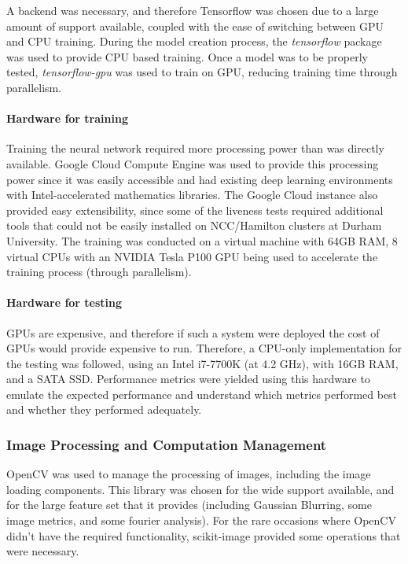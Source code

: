 \documentclass[10pt,a4paper]{article}
\begin{document}
            A backend was necessary, and therefore Tensorflow was chosen due to a large amount of support available, coupled with the ease of switching between GPU and CPU training. During the model creation process, the \emph{tensorflow} package was used to provide CPU based training. Once a model was to be properly tested, \emph{tensorflow-gpu} was used to train on GPU, reducing training time through parallelism.  

            \paragraph{Hardware for training}
            Training the neural network required more processing power than was directly available. Google Cloud Compute Engine was used to provide this processing power since it was easily accessible and had existing deep learning environments with Intel-accelerated mathematics libraries. 
            The Google Cloud instance also provided easy extensibility, since some of the liveness tests required additional tools that could not be easily installed on NCC/Hamilton clusters at Durham University. The training was conducted on a virtual machine with 64GB RAM, 8 virtual CPUs
            with an NVIDIA Tesla P100 GPU being used to accelerate the training process (through parallelism).

            \paragraph{Hardware for testing}
            GPUs are expensive, and therefore if such a system were deployed the cost of GPUs would provide expensive to run. Therefore, a CPU-only implementation for the testing was followed, using an Intel i7-7700K (at 4.2 GHz), with 16GB RAM, and a SATA SSD. Performance metrics were yielded using this hardware to emulate the expected performance and understand which metrics performed best and whether they performed adequately.

        \subsubsection{Image Processing and Computation Management}
            OpenCV was used to manage the processing of images, including the image loading components. This library was chosen for the wide support available, and for the large feature set that it provides (including Gaussian Blurring, some image metrics, and some fourier analysis).
            For the rare occasions where OpenCV didn't have the required functionality, scikit-image provided some operations that were necessary.
            
\end{document}
